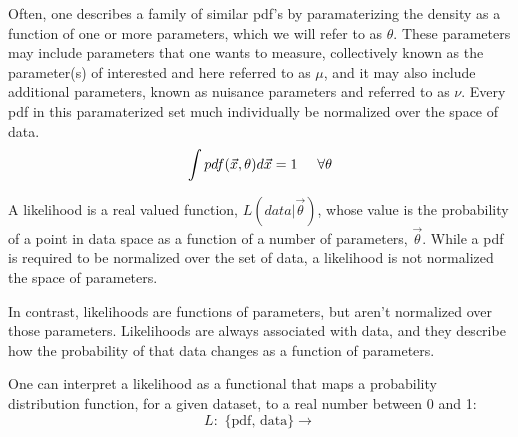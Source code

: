 Often, one describes a family of similar pdf's by paramaterizing the density as a function of one or more parameters, which we will refer to as $\theta$.
These parameters may include parameters that one wants to measure, collectively known as the parameter(s) of interested and here referred to as $\mu$, and it may also include additional parameters, known as nuisance parameters and referred to as $\nu$. %
Every pdf in this paramaterized set much individually be normalized over the space of data. 
\begin{equation}
  \int pdf(\vec{x}, \theta) d\vec{x} = 1 \hspace{5mm} \forall \theta %
\end{equation}


A likelihood is a real valued function, $L(data | \vec{\theta})$, whose value is the probability of a point in data space as a function of a number of parameters, $\vec{\theta}$.
While a pdf is required to be normalized over the set of data, a likelihood is not normalized the space of parameters.


In contrast, likelihoods are functions of parameters, but aren't normalized over those parameters.
Likelihoods are always associated with data, and they describe how the probability of that data changes as a function of parameters.

One can interpret a likelihood as a functional that maps a probability distribution function, for a given dataset, to a real number between 0 and 1:
\begin{equation}
  L: \text{ \{pdf, data\} } \rightarrow %
\end{equation}

